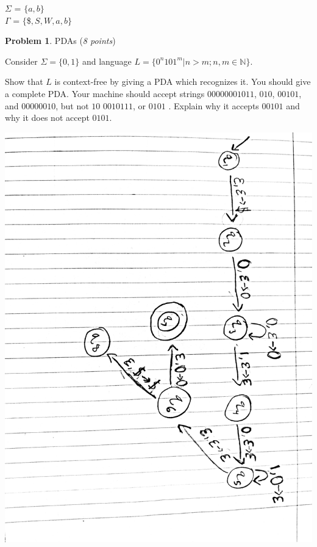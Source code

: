 \documentclass[11pt]{article}
\theoremstyle{definition}
\theoremstyle{theorem}
\newtheorem{prob}{Problem}
\newcommand{\solution}{\medskip\noindent{\color{blue}\textbf{Solution:}}}
\begin{document}
\begin{enumerate}[label=(\alph*)]
$\Sigma$ = $\{a, b\}$ \\
$\Gamma$ = $\{$\$$, S, W, a, b\}$ 






\end{enumerate}


\newpage

\begin{prob} PDAs (\emph{8 points})\end{prob}

Consider $\Sigma = \{0,1\}$ and language $L = \{0^n101^m | n > m; n, m \in \mathbb{N}\}$.

Show that $L$ is context-free by giving a PDA which recognizes it.
You should give a complete PDA. Your machine should accept strings $00000001011$, $010$, $00101$, and $00000010$, but not $10$ $0010111$, or $0101$ . Explain why it accepts $00101$ and why it does not accept $0101$.

\solution 

\includegraphics[angle=90,origin=c, scale=0.15]{./p3/hwp3.jpg}
\end{document}
